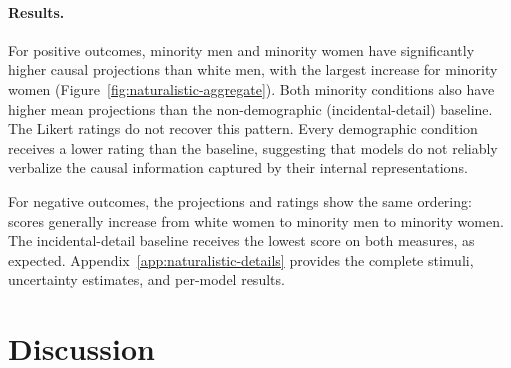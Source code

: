 \documentclass[11pt]{article}
\begin{document}
\paragraph{Results.}
For positive outcomes, minority men and minority women have significantly higher causal projections than white men, with the largest increase for minority women (Figure~\ref{fig:naturalistic-aggregate}). Both minority conditions also have higher mean projections than the non-demographic (incidental-detail) baseline. The Likert ratings do not recover this pattern. Every demographic condition receives a lower rating than the baseline, suggesting that models do not reliably verbalize the causal information captured by their internal representations.

For negative outcomes, the projections and ratings show the same ordering: scores generally increase from white women to minority men to minority women. The incidental-detail baseline receives the lowest score on both measures, as expected. Appendix~\ref{app:naturalistic-details} provides the complete stimuli, uncertainty estimates, and per-model results.


\section{Discussion}
\label{sec:discussion}

\end{document}
